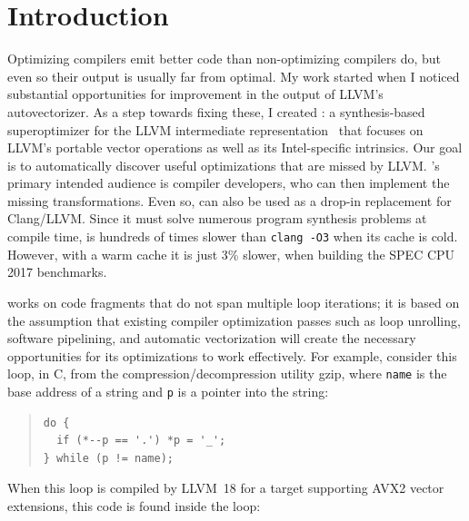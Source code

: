 \section{Introduction}

Optimizing compilers emit better code than non-optimizing compilers
do, but even so their output is usually far from optimal.
%
My work started when I noticed substantial opportunities for
improvement in the output of LLVM's autovectorizer.
%
As a step towards fixing these, I created \minotaur{}: a synthesis-based
superoptimizer for the LLVM intermediate
representation~\cite{LLVM:CGO04} that focuses on LLVM's portable
vector operations as well as its Intel-specific intrinsics.
%
Our goal is to automatically discover useful optimizations that are
missed by LLVM\@.
%
\minotaur's primary intended audience is compiler developers, who can then
implement the missing transformations.
%
Even so, \minotaur{} can also be used as a drop-in replacement for
Clang/LLVM\@.
%
Since it must solve numerous program synthesis problems at compile
time, \minotaur{} is hundreds of times slower than \texttt{clang -O3}
when its cache is cold.
%
However, with a warm cache it is just 3\% slower, when building the
SPEC CPU 2017 benchmarks.


\minotaur{} works on code fragments that do not span multiple loop
iterations; it is based on the assumption that existing compiler
optimization passes such as loop unrolling, software pipelining, and
automatic vectorization will create the necessary opportunities for
its optimizations to work effectively.
%
For example, consider this loop, in C, from the
compression/decompression utility gzip, where \texttt{name} is the
base address of a string and \texttt{p} is a pointer into the string:

{\begin{quote}
\begin{verbatim}
do {
  if (*--p == '.') *p = '_';
} while (p != name);
\end{verbatim}
\end{quote}}

When this loop is compiled by LLVM~18 for a target supporting AVX2
vector extensions, this code is found inside the loop:

